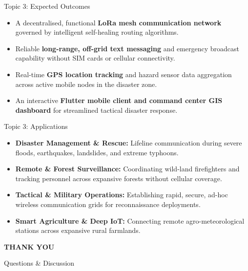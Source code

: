 \documentclass{beamer}
\begin{document}
\begin{frame}{Topic 3: Expected Outcomes}
\begin{itemize}
  \item A decentralised, functional \textbf{LoRa mesh communication network} governed by intelligent self-healing routing algorithms.
  \vspace{0.3cm}
  \item Reliable \textbf{long-range, off-grid text messaging} and emergency broadcast capability without SIM cards or cellular connectivity.
  \vspace{0.3cm}
  \item Real-time \textbf{GPS location tracking} and hazard sensor data aggregation across active mobile nodes in the disaster zone.
  \vspace{0.3cm}
  \item An interactive \textbf{Flutter mobile client and command center GIS dashboard} for streamlined tactical disaster response.
\end{itemize}
\end{frame}

\begin{frame}{Topic 3: Applications}
\begin{itemize}
  \item \textbf{Disaster Management \& Rescue:} Lifeline communication during severe floods, earthquakes, landslides, and extreme typhoons.
  \vspace{0.3cm}
  \item \textbf{Remote \& Forest Surveillance:} Coordinating wild-land firefighters and tracking personnel across expansive forests without cellular coverage.
  \vspace{0.3cm}
  \item \textbf{Tactical \& Military Operations:} Establishing rapid, secure, ad-hoc wireless communication grids for reconnaissance deployments.
  \vspace{0.3cm}
  \item \textbf{Smart Agriculture \& Deep IoT:} Connecting remote agro-meteorological stations across expansive rural farmlands.
\end{itemize}
\end{frame}

\begin{frame}{}
    \begin{center}
      \begin{huge}
          \textbf{THANK YOU}
      \end{huge}
      \vspace{0.5cm}
      \par\Large Questions \& Discussion
    \end{center}
\end{frame}
\end{document}
